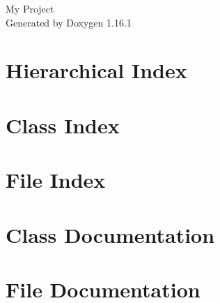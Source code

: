 \documentclass[twoside]{book}
\newcommand{\+}{\discretionary{\mbox{\scriptsize$\hookleftarrow$}}{}{}}
\newcommand{\clearemptydoublepage}{%
    \newpage{\pagestyle{empty}\cleardoublepage}%
  }
\begin{document}
  \raggedbottom
    \hypersetup{pageanchor=false,
                bookmarksnumbered=true,
                pdfencoding=unicode
               }
  \begin{titlepage}
  \vspace*{7cm}
  \begin{center}%
  {\Large My Project}\\
  \vspace*{1cm}
  {\large Generated by Doxygen 1.16.1}\\
  \end{center}
  \end{titlepage}
  \clearemptydoublepage
  \tableofcontents
  \clearemptydoublepage
  \hypersetup{pageanchor=true}
\chapter{Hierarchical Index}

\chapter{Class Index}

\chapter{File Index}

\chapter{Class Documentation}








\chapter{File Documentation}








  \backmatter
  \newpage
  \clearemptydoublepage
  \printindex
\end{document}
